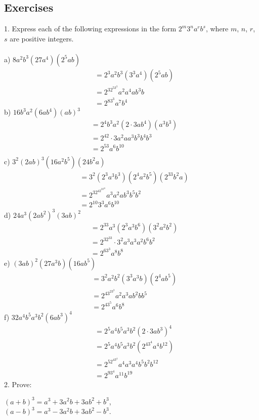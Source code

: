 \documentclass[12pt]{article}
\begin{document}
\subsection*{Exercises}
1. Express each of the following expressions in the form $2^m3^na^rb^s$, where $m$, $n$, $r$, $s$ are positive integers. \\
\\
\noindent a) $8a^2b^3(27a^4)(2^5ab)$
\begin{align*}
&=2^3a^2b^3(3^3a^4)(2^5ab) \\
&=2^32^53^3a^2a^4ab^3b \\
&=2^83^3a^7b^4
\end{align*}
b) $16b^3a^2(6ab^4)(ab)^3$
\begin{align*}
&=2^4b^3a^2(2\cdot3ab^4)(a^3b^3) \\
&=2^42\cdot3a^2aa^3b^3b^4b^3 \\
&=2^53a^6b^{10} \\
\end{align*}
c) $3^2(2ab)^3(16a^2b^5)(24b^2a)$
\begin{align*}
&=3^2(2^3a^3b^3)(2^4a^2b^5)(2^33b^2a) \\
&=2^32^42^33^23a^3a^2ab^3b^5b^2 \\
&=2^{10}3^3a^6b^{10}
\end{align*}
d) $24a^3(2ab^2)^3(3ab)^2$
\begin{align*}
&=2^33a^3(2^3a^3b^6)(3^2a^2b^2) \\
&=2^32^33\cdot3^2a^3a^3a^2b^6b^2 \\
&=2^63^3a^8b^8
\end{align*}
e) $(3ab)^2(27a^3b)(16ab^5)$
\begin{align*}
&=3^2a^2b^2(3^3a^3b)(2^4ab^5) \\
&=2^43^23^3a^2a^3ab^2bb^5 \\
&=2^43^5a^6b^8
\end{align*}
f) $32a^4b^5a^3b^2(6ab^3)^4$
\begin{align*}
&=2^5a^4b^5a^3b^2(2\cdot3ab^3)^4 \\
&=2^5a^4b^5a^3b^2(2^43^4a^4b^{12}) \\
&=2^52^43^4a^4a^3a^4b^5b^2b^{12} \\
&=2^93^4a^{11}b^{19}
\end{align*}
2. Prove:
\begin{center}
$(a+b)^3=a^3+3a^2b+3ab^2+b^3$, \\
$(a-b)^3=a^3-3a^2b+3ab^2-b^3$.
\end{center}
\end{document}
